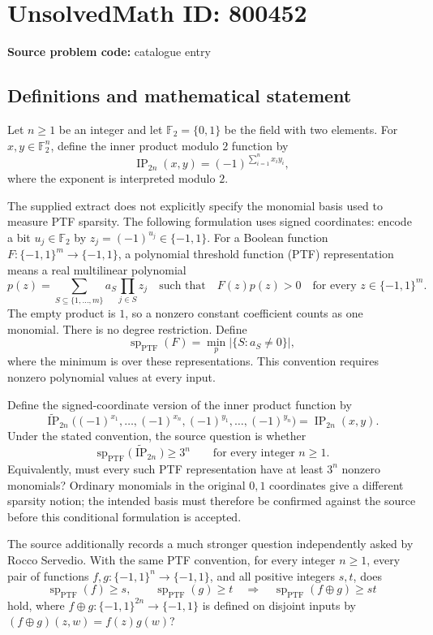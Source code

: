 \documentclass[11pt]{article}
\newcommand{\F}{\mathbb{F}}
\begin{document}
\section*{UnsolvedMath ID: 800452}
\textbf{Source problem code:} catalogue entry
\subsection{Definitions and mathematical statement}
Let \(n\geq 1\) be an integer and let \(\F_2=\{0,1\}\) be the field with two elements. For \(x,y\in\F_2^n\), define the inner product modulo \(2\) function by
\[
\operatorname{IP}_{2n}(x,y)=(-1)^{\sum_{i=1}^{n}x_i y_i},
\]
where the exponent is interpreted modulo \(2\).

The supplied extract does not explicitly specify the monomial basis used to measure PTF sparsity. The following formulation uses signed coordinates: encode a bit \(u_j\in\F_2\) by \(z_j=(-1)^{u_j}\in\{-1,1\}\). For a Boolean function \(F\colon\{-1,1\}^m\to\{-1,1\}\), a polynomial threshold function (PTF) representation means a real multilinear polynomial
\[
p(z)=\sum_{S\subseteq\{1,\ldots,m\}}a_S\prod_{j\in S}z_j
\quad\text{such that}\quad
F(z)p(z)>0\quad\text{for every }z\in\{-1,1\}^m.
\]
The empty product is \(1\), so a nonzero constant coefficient counts as one monomial. There is no degree restriction. Define
\[
\operatorname{sp}_{\mathrm{PTF}}(F)
=\min_p\bigl|\{S:a_S\ne0\}\bigr|,
\]
where the minimum is over these representations. This convention requires nonzero polynomial values at every input.

Define the signed-coordinate version of the inner product function by
\[
\widetilde{\operatorname{IP}}_{2n}
\bigl((-1)^{x_1},\ldots,(-1)^{x_n},
      (-1)^{y_1},\ldots,(-1)^{y_n}\bigr)
=\operatorname{IP}_{2n}(x,y).
\]
Under the stated convention, the source question is whether
\[
\operatorname{sp}_{\mathrm{PTF}}
\bigl(\widetilde{\operatorname{IP}}_{2n}\bigr)\geq 3^n
\qquad\text{for every integer }n\geq1.
\]
Equivalently, must every such PTF representation have at least \(3^n\) nonzero monomials? Ordinary monomials in the original \(0,1\) coordinates give a different sparsity notion; the intended basis must therefore be confirmed against the source before this conditional formulation is accepted.

The source additionally records a much stronger question independently asked by Rocco Servedio. With the same PTF convention, for every integer \(n\geq1\), every pair of functions \(f,g\colon\{-1,1\}^n\to\{-1,1\}\), and all positive integers \(s,t\), does
\[
\operatorname{sp}_{\mathrm{PTF}}(f)\geq s,
\qquad
\operatorname{sp}_{\mathrm{PTF}}(g)\geq t
\quad\Longrightarrow\quad
\operatorname{sp}_{\mathrm{PTF}}(f\oplus g)\geq st
\]
hold, where \(f\oplus g\colon\{-1,1\}^{2n}\to\{-1,1\}\) is defined on disjoint inputs by \((f\oplus g)(z,w)=f(z)g(w)\)?
\end{document}
